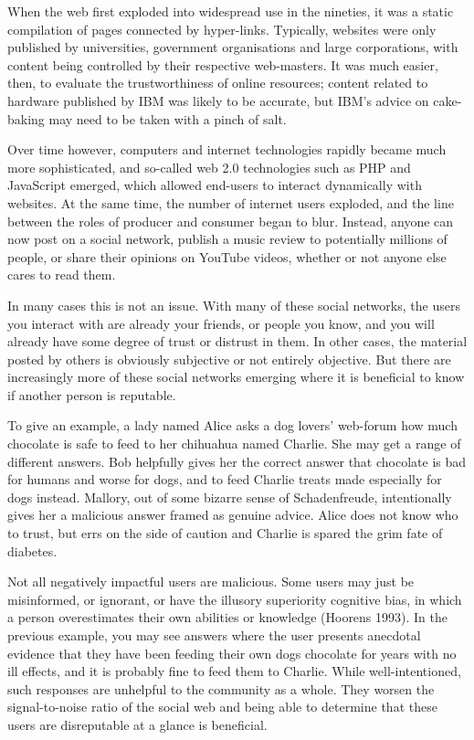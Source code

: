 \documentclass[]{final_report}
\begin{document}
When the web first exploded into widespread use in the nineties, it was a static compilation of pages connected by hyper-links. Typically, websites were only published by universities, government organisations and large corporations, with content being controlled by their respective web-masters. It was much easier, then, to evaluate the trustworthiness of online resources; content related to hardware published by IBM was likely to be accurate, but IBM's advice on cake-baking may need to be taken with a pinch of salt.

Over time however, computers and internet technologies rapidly became much more sophisticated, and so-called web 2.0 technologies such as PHP and JavaScript emerged, which allowed end-users to interact dynamically with websites. At the same time, the number of internet users exploded, and the line between the roles of producer and consumer began to blur. Instead, anyone can now post on a social network, publish a music review to potentially millions of people, or share their opinions on YouTube videos, whether or not anyone else cares to read them.

In many cases this is not an issue. With many of these social networks, the users you interact with are already your friends, or people you know, and you will already have some degree of trust or distrust in them. In other cases, the material posted by others is obviously subjective or not entirely objective. But there are increasingly more of these social networks emerging where it is beneficial to know if another person is reputable.

To give an example, a lady named Alice asks a dog lovers' web-forum how much chocolate is safe to feed to her chihuahua named Charlie. She may get a range of different answers. Bob helpfully gives her the correct answer that chocolate is bad for humans and worse for dogs, and to feed Charlie treats made especially for dogs instead. Mallory, out of some bizarre sense of Schadenfreude, intentionally gives her a malicious answer framed as genuine advice. Alice does not know who to trust, but errs on the side of caution and Charlie is spared the grim fate of diabetes.

Not all negatively impactful users are malicious. Some users may just be misinformed, or ignorant, or have the illusory superiority cognitive bias, in which a person overestimates their own abilities or knowledge (Hoorens 1993). In the previous example, you may see answers where the user presents anecdotal evidence that they have been feeding their own dogs chocolate for years with no ill effects, and it is probably fine to feed them to Charlie. While well-intentioned, such responses are unhelpful to the community as a whole. They worsen the signal-to-noise ratio of the social web and being able to determine that these users are disreputable at a glance is beneficial.
\end{document}
